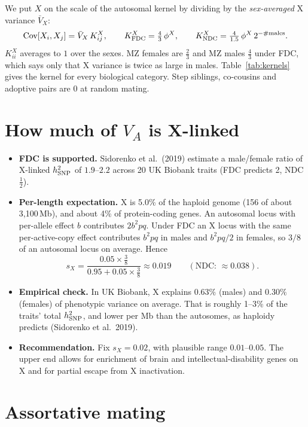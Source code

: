 \documentclass[11pt]{article}
\newcommand{\Cov}{\operatorname{Cov}}
\newcommand{\Kx}{K^{X}}
\begin{document}
We put $X$ on the scale of the autosomal kernel by dividing by the \emph{sex-averaged} X variance
$\bar V_X$:
\[
\Cov[X_i,X_j]=\bar V_X\,\Kx_{ij},\qquad
\Kx_{\rm FDC}=\tfrac43\,\phi^X,\qquad \Kx_{\rm NDC}=\tfrac{4}{1.5}\,\phi^X\,2^{-\#\text{males}} .
\]
$\Kx_{ii}$ averages to $1$ over the sexes. MZ females are $\tfrac23$ and MZ males $\tfrac43$ under FDC, which
says only that X variance is twice as large in males. Table~\ref{tab:kernels} gives the kernel for every
biological category. Step siblings, co-cousins and adoptive pairs are $0$ at random mating.

\section{How much of \texorpdfstring{$V_A$}{VA} is X-linked}\label{sec:sx}
\begin{itemize}
  \item \textbf{FDC is supported.} Sidorenko et al.\ (2019) estimate a male/female ratio of X-linked
    $h^2_{\rm SNP}$ of $1.9$--$2.2$ across 20 UK Biobank traits (FDC predicts 2, NDC $\tfrac12$).
  \item \textbf{Per-length expectation.} X is 5.0\% of the haploid genome (156 of about 3{,}100\,Mb), and
    about 4\% of protein-coding genes. An autosomal locus with per-allele effect $b$ contributes $2b^2pq$.
    Under FDC an X locus with the same per-active-copy effect contributes $b^2pq$ in males and $b^2pq/2$ in
    females, so $3/8$ of an autosomal locus on average. Hence
    \[
    s_X=\frac{0.05\times\tfrac38}{0.95+0.05\times\tfrac38}\approx0.019\qquad(\text{NDC: }\approx0.038).
    \]
  \item \textbf{Empirical check.} In UK Biobank, X explains $0.63\%$ (males) and $0.30\%$ (females) of
    phenotypic variance on average. That is roughly 1--3\% of the traits' total $h^2_{\rm SNP}$, and lower per
    Mb than the autosomes, as haploidy predicts (Sidorenko et al.\ 2019).
  \item \textbf{Recommendation.} Fix $s_X=0.02$, with plausible range $0.01$--$0.05$. The upper end allows for
    enrichment of brain and intellectual-disability genes on X and for partial escape from X inactivation.
\end{itemize}

\section{Assortative mating}\label{sec:am}
\end{document}
